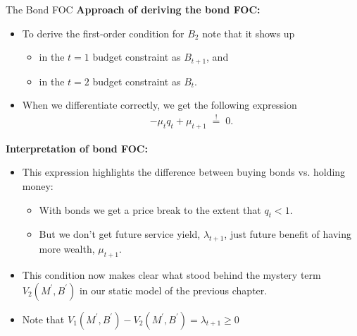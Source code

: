\documentclass[10pt,c,aspectratio=1610,handout]{beamer}
\begin{document}
\begin{frame}{The Bond FOC}%
  \textbf{Approach of deriving the bond FOC:}%
  \begin{itemize}%
    \item[$\blacktriangleright$] To derive the first-order condition for $B_2$ note that it shows up%
    \begin{itemize}%
      \item[$\rightarrow$] in the $t=1$ budget constraint as $B_{t+1}$, and%
      \item[$\rightarrow$] in the $t=2$ budget constraint as $B_t$.%
    \end{itemize}%
    \pause%
    \item[$\blacktriangleright$] When we differentiate correctly, we get the following expression%
    \begin{align}%
      -\mu_{t} q_{t} + \mu_{t+1} \; \overset{!}{=} \; 0.%
    \end{align}%
  \end{itemize}%
  \pause%
  \textbf{Interpretation of bond FOC:}%
  \begin{itemize}%
    \item[$\blacktriangleright$] This expression highlights the difference between buying bonds vs. holding money:%
    \begin{itemize}%
      \item[$\rightarrow$] With bonds we get a price break to the extent that $q_{t}<1$.%
      \item[$\rightarrow$] But we don't get future service yield, $\lambda _{t+1}$, just future benefit of having more wealth, $\mu _{t+1}.$%
    \end{itemize}%
    \item[$\blacktriangleright$] This condition now makes clear what stood behind the mystery term $V_{2}(M^{\prime },B^{\prime })$ in our static model of the previous chapter.%
    \pause%
    \item[$\blacktriangleright$] Note that $V_{1}(M^{\prime}, B^{\prime}) - V_{2}(M^{\prime}, B^{\prime}) = \lambda_{t+1} \geq 0$%
  \end{itemize}%
\end{frame}%
\end{document}
